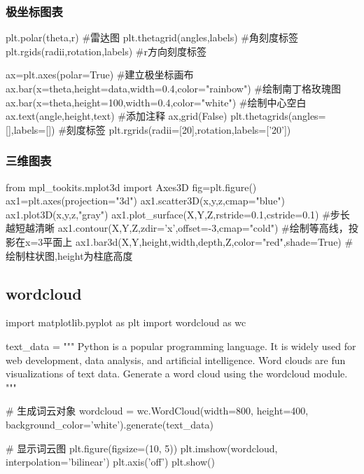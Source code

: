 \documentclass{article}
\begin{document}
      \subsubsection{极坐标图表}
        \begin{codeblock}[language=python, caption={polar plots of plt}]
          plt.polar(theta,r) #雷达图
          plt.thetagrid(angles,labels) #角刻度标签
          plt.rgids(radii,rotation,labels) #r方向刻度标签

          ax=plt.axes(polar=True) #建立极坐标画布
          ax.bar(x=theta,height=data,width=0.4,color="rainbow") #绘制南丁格玫瑰图
          ax.bar(x=theta,height=100,width=0.4,color="white") #绘制中心空白
          ax.text(angle,height,text) #添加注释
          ax,grid(False)
          plt.thetagrids(angles=[],labels=[]) #刻度标签
          plt.rgrids(radii=[20],rotation,labels=['20'])
        \end{codeblock}

      \subsubsection{三维图表}
        \begin{codeblock}[language=python, caption={3D plots of plt}]
          from mpl_tookits.mplot3d import Axes3D
          fig=plt.figure()
          ax1=plt.axes(projection="3d")
          ax1.scatter3D(x,y,z,cmap="blue")
          ax1.plot3D(x,y,z,"gray")
          ax1.plot_surface(X,Y,Z,rstride=0.1,cstride=0.1) #步长越短越清晰
          ax1.contour(X,Y,Z,zdir='x',offset=-3,cmap="cold") #绘制等高线，投影在x=3平面上
          ax1.bar3d(X,Y,height,width,depth,Z,color="red",shade=True) #绘制柱状图,height为柱底高度
        \end{codeblock}

    \subsection{wordcloud}
      \begin{codeblock}[language=python, caption={wordcloud}]
        import matplotlib.pyplot as plt
        import wordcloud as wc

        text_data = """
        Python is a popular programming language.
        It is widely used for web development, data analysis, and artificial intelligence.
        Word clouds are fun visualizations of text data.
        Generate a word cloud using the wordcloud module.
        """

        # 生成词云对象
        wordcloud = wc.WordCloud(width=800, height=400, background_color='white').generate(text_data)

        # 显示词云图
        plt.figure(figsize=(10, 5))
        plt.imshow(wordcloud, interpolation='bilinear')
        plt.axis('off')
        plt.show()
      \end{codeblock}
\end{document}
